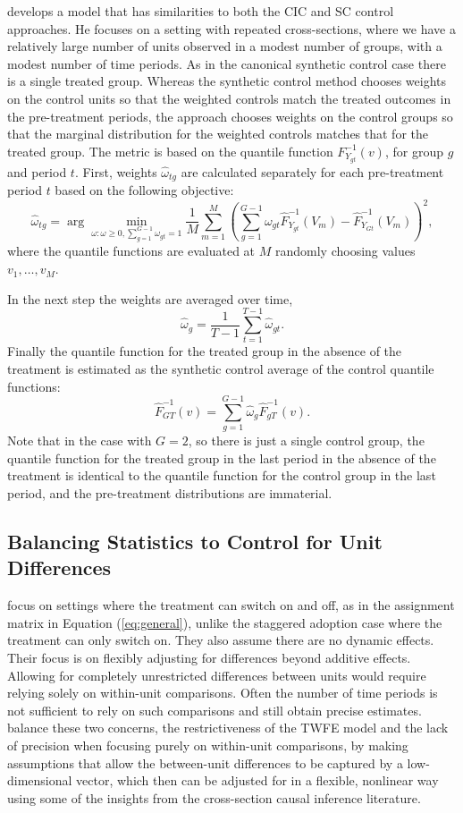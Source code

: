 \documentclass[letterpaper,12pt,leqno]{article}
\begin{document}
\citep{gunsilius2023distributional} develops a model that has similarities to both the CIC and SC control approaches. He focuses on a setting with repeated cross-sections, where we have a relatively large number of units observed in a modest number of groups, with a modest number of time periods.
As in the canonical synthetic control case there is a single treated group. 
Whereas the synthetic control method chooses weights on the control units so that the weighted controls match the treated outcomes in the pre-treatment periods, 
the \citep{gunsilius2023distributional} approach chooses weights on the control groups so that the marginal distribution for the weighted controls matches that for the treated group. The metric is based on the quantile function $F_{Y_{gt}}^{-1}(v)$,  for group $g$ and period $t$.
First, weights $\hat\omega_{tg}$ are calculated separately for each pre-treatment period $t$ 
based on the
following objective:
\[ \hat\omega_{tg}=\arg\min_{\omega:\omega\geq 0, \sum_{g=1}^{G-1}\omega_{gt}=1}
\frac{1}{M}\sum_{m=1}^M
\left(
\sum_{g=1}^{G-1} \omega_{gt}\hat F_{Y_{gt}}^{-1} (V_m)-
\hat F_{Y_{Gt}}^{-1} (V_m)
\right)^2,
\]
where the quantile functions are evaluated at $M$ randomly choosing values $v_1,\ldots,v_M$.

In the next step the weights are averaged over time,
\[ \hat\omega_g=\frac{1}{T-1}\sum_{t=1}^{T-1} \hat\omega_{gt}.\]
Finally the quantile function for the treated group in the absence of the treatment is estimated as the synthetic control average of the control quantile functions:
\[ \hat F^{-1}_{GT}(v)=\sum_{g=1}^{G-1} \hat\omega_g
\hat F^{-1}_{gT}(v).\]
Note that in the case with $G=2$, so there is just a single control group, the quantile function for the treated group in the last period in the absence of the treatment is identical to the quantile function for the control group in the last period, and the pre-treatment distributions are immaterial.



\subsection{Balancing Statistics to Control for Unit Differences}

\citep*{arkhangelsky2022doubly} focus on settings where the treatment can switch on and off, as in the assignment matrix in Equation (\ref{eq:general}),  unlike the staggered adoption case where the treatment can only switch on. They also assume there are no dynamic effects. Their focus is on flexibly adjusting for differences beyond additive effects. Allowing for completely unrestricted differences between units would require relying solely on within-unit comparisons. Often the number of time periods is not sufficient to rely on such comparisons and still obtain precise estimates. \citep*{arkhangelsky2022doubly} balance these two concerns, the restrictiveness of the TWFE model and the lack of precision when focusing purely on within-unit comparisons, by making assumptions that allow the between-unit differences to be captured by a low-dimensional vector, which then can be adjusted for in a flexible, nonlinear way using some of the insights from the cross-section causal inference literature.
\end{document}

